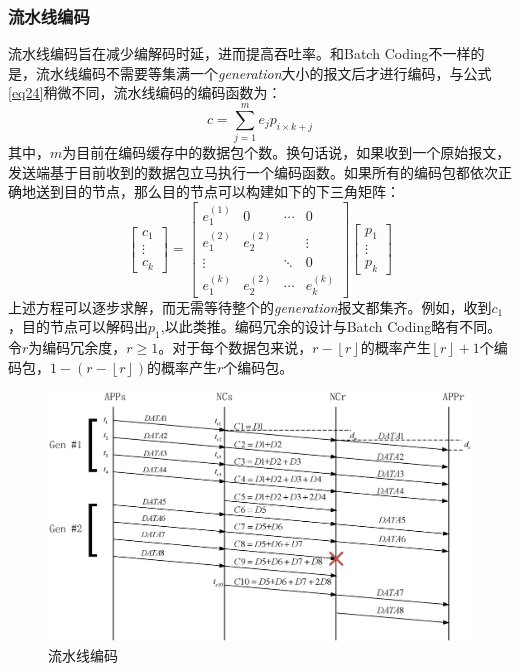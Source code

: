 \subsubsection[Pipeline Coding]{\textbf{流水线编码}}\label{pipelinesec}
流水线编码旨在减少编解码时延，进而提高吞吐率。和Batch Coding不一样的是，流水线编码不需要等集满一个\emph{generation}大小的报文后才进行编码，与公式\ref{eq24}稍微不同，流水线编码的编码函数为：
\begin{equation}
c = \sum\limits_{j = 1}^m {{e_j}{p_{i \times k + j}}}
\end{equation}
其中，$m$为目前在编码缓存中的数据包个数。换句话说，如果收到一个原始报文，发送端基于目前收到的数据包立马执行一个编码函数。如果所有的编码包都依次正确地送到目的节点，那么目的节点可以构建如下的下三角矩阵：
\begin{equation}\label{eq28}
\left[ {\begin{array}{*{20}{c}}
	{{c_1}}\\
	\vdots \\
	{{c_k}}
	\end{array}} \right] = \left[ {\begin{array}{*{20}{c}}
	{e_1^{\left( 1 \right)}}&0& \cdots &0\\
	{e_1^{\left( 2 \right)}}&{e_2^{\left( 2 \right)}}&{}& \vdots \\
	\vdots &{}& \ddots &0\\
	{e_1^{\left( k \right)}}&{e_2^{\left( 2 \right)}}& \cdots &{e_k^{\left( k \right)}}
	\end{array}} \right]\left[ {\begin{array}{*{20}{c}}
	{{p_1}}\\
	\vdots \\
	{{p_k}}
	\end{array}} \right]
\end{equation}
上述方程可以逐步求解，而无需等待整个的\emph{generation}报文都集齐。例如，收到$c_{1}$，目的节点可以解码出$p_{1}$,以此类推。编码冗余的设计与Batch Coding略有不同。令$r$为编码冗余度，$r \ge 1$。对于每个数据包来说，$r - \left\lfloor r \right\rfloor $的概率产生$\left\lfloor r \right\rfloor + 1$个编码包，$1 - \left({r - \left\lfloor r \right\rfloor} \right)$的概率产生$r$个编码包。
\begin{figure}[htbp]
	\centering
	\includegraphics[width=6in]{figures/pipeline.eps}
	\caption{流水线编码}
	\label{LIUSHUIXIAN_EPS}
\end{figure}
